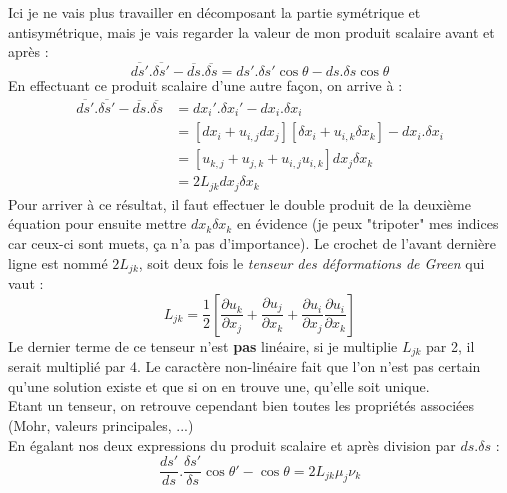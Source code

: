     Ici je ne vais plus travailler en décomposant la partie symétrique et antisymétrique, mais je 
    vais regarder la valeur de mon produit scalaire avant et après :
    \begin{equation}
    \overline{ds'}.\overline{\delta s'} - \overline{ds}.\overline{\delta s} = ds'.\delta s'\cos\theta
    - ds. \delta s \cos\theta
    \end{equation}
    En effectuant ce produit scalaire d'une autre façon, on arrive à : 
    \begin{equation}
    \begin{array}{ll}
    \overline{ds'}.\overline{\delta s'} - \overline{ds}.\overline{\delta s} &=dx_i'.\delta x_i' - dx_i.
    \delta x_i\\
     &= [dx_i + u_{i,j}dx_j][\delta x_i + u_{i,k} \delta x_k] - dx_i.\delta x_i\\
     &= [u_{k,j} + u_{j,k} + u_{i,j}u_{i,k}]dx_j\delta x_k\\
     &= 2 L_{jk} dx_j \delta x_k
    \end{array}
    \end{equation}
    Pour arriver à ce résultat, il faut effectuer le double produit de la deuxième équation pour 
    ensuite mettre $dx_k\delta x_k$ en évidence (je peux "tripoter" mes indices car ceux-ci sont 
    muets, ça n'a pas d'importance). Le crochet de l'avant dernière ligne est nommé $2L_{jk}$, 
    soit deux fois le \textit{tenseur des déformations de Green} qui vaut :
    \begin{equation}
    L_{jk} = \dfrac{1}{2}\left[\dfrac{\partial u_k}{\partial x_j}+\dfrac{\partial u_j}{\partial x_k}
    +\dfrac{\partial u_i}{\partial x_j}\dfrac{\partial u_i}{\partial x_k}\right]
    \end{equation}
    Le dernier terme de ce tenseur n'est \textbf{pas} linéaire, si je multiplie $L_{jk}$ par 2,
    il serait multiplié par 4. Le caractère non-linéaire fait que l'on n'est pas certain qu'une
    solution existe et que si on en trouve une, qu'elle soit unique.\\
    Etant un tenseur, on retrouve cependant bien toutes les propriétés associées (Mohr, valeurs
    principales, ...)\\
    
    En égalant nos deux expressions du produit scalaire et après division par $ds.\delta s$ :
    \begin{equation}
    \dfrac{ds'}{ds}.\dfrac{\delta s'}{\delta s}\cos\theta' - \cos\theta = 2L_{jk}\mu_j\nu_k
    \end{equation}
    
